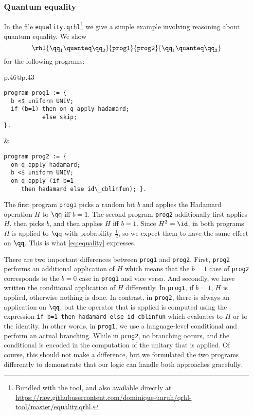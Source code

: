 \documentclass{article}
\newcommand\giturl[1]{\url{https://raw.githubusercontent.com/dominique-unruh/qrhl-tool/master/#1}}
\begin{document}

\subsubsection{Quantum equality}
\label{sec:qeq.example}

In the file \texttt{equality.qrhl}\footnote{Bundled with the tool, and
  also available directly at \giturl{equality.qrhl}.} we give a simple
example involving reasoning about quantum equality. We show
\begin{equation}\label{eq:equality}
\rhl{\qq_1\quanteq\qq_2}{\mathtt{prog1}}{\mathtt{prog2}}{\qq_1\quanteq\qq_2}
\end{equation}
for the following programs:

{\centering
    \lstset{aboveskip=0pt,belowskip=0pt}
\begin{tabular}{p{.46\hsize}@{\hskip40pt}p{.43\hsize}}
  \begin{lstlisting}
program prog1 := {
  b <$ uniform UNIV;
  if (b=1) then on q apply hadamard;
           else skip;
}.
  \end{lstlisting}%
  &
  \begin{lstlisting}
program prog2 := {
  on q apply hadamard;
  b <$ uniform UNIV;
  on q apply (if b=1
     then hadamard else id\_cblinfun); }.
  \end{lstlisting}%
\end{tabular}
}

The first program \texttt{prog1} picks a random bit $b$
and applies the Hadamard operation $H$
to $\qq$
iff $b=1$.
The second program \texttt{prog2} additionally first applies $H$,
then picks $b$,
and then applies $H$
iff $b=1$.
Since $H^2=\id$,
in both programs $H$
is applied to $\qq$
with probability $\frac12$,
so we expect them to have the same effect on $\qq$.
This is what \eqref{eq:equality} expresses.

There are two important differences between \texttt{prog1} and
\texttt{prog2}. First, \texttt{prog2} performs an additional
application of $H$
which means that the $b=1$
case of \texttt{prog2} corresponds to the $b=0$
case in \texttt{prog1} and vice versa. And secondly, we have written
the conditional application of $H$
differently.  In \texttt{prog1}, if $b=1$,
$H$
is applied, otherwise nothing is done.  In contrast, in
\texttt{prog2}, there is always an application on $\qq$,
but the operator that is applied is computed using the expression
\texttt{if b=1 then hadamard else id\_cblinfun} which evaluates to $H$
or to the identity. In other words, in \texttt{prog1}, we use a
language-level conditional and perform an actual branching. While in
\texttt{prog2}, no branching occurs, and the conditional is encoded in
the computation of the unitary that is applied. Of course, this should
not make a difference, but we formulated the two programs differently
to demonstrate that our logic can handle both approaches gracefully.
\end{document}
